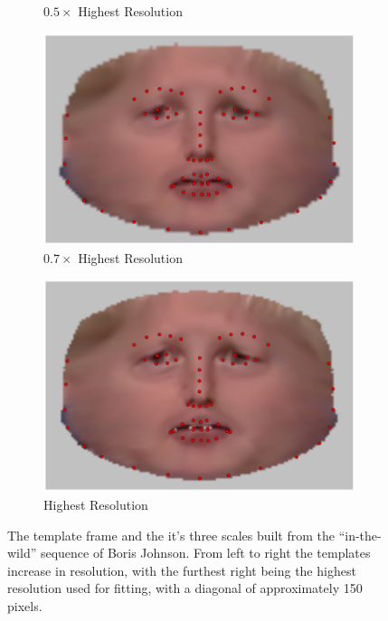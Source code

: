 \begin{figure}
\begin{subfigure}[b]{0.23\textwidth}
        \caption*{$0.5\times$ Highest Resolution}
    \end{subfigure}  \hfill
    \begin{subfigure}[b]{0.23\textwidth}
        \centering
        \includegraphics[width=\textwidth]{face_flow/images/boris/boris_sampled_template_07}
        \caption*{$0.7\times$ Highest Resolution}
    \end{subfigure}  \hfill
    \begin{subfigure}[b]{0.23\textwidth}
        \centering
        \includegraphics[width=\textwidth]{face_flow/images/boris/boris_sampled_template_10}
        \caption*{Highest Resolution}
    \end{subfigure}
    \hspace*{\fill}
    \caption{The template frame and the it's three scales built from the
             ``in-the-wild'' sequence of Boris Johnson. From left to right
             the templates increase in resolution, with the furthest right being
             the highest resolution used for fitting, with a diagonal of
             approximately 150 pixels.}
\label{fig:face_flow_boris_references}
\end{figure}
